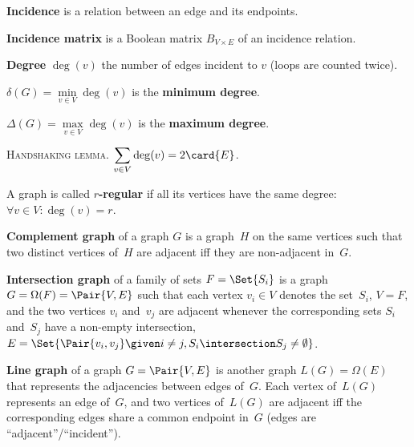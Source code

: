 \documentclass[a4paper,10pt]{article}
\newcommand{\op}[1]{\operatorname*{#1}}
\newcommand{\degree}[1]{\op{deg}(#1)}
\newcommand{\minDegree}[1]{\delta(#1)}
\newcommand{\maxDegree}[1]{\Delta(#1)}
\begin{document}
\begin{terms}
\begin{minipage}{\linewidth}
    \item \textbf{Incidence} is a relation between an edge and its endpoints.
    \item \textbf{Incidence matrix} is a Boolean matrix $B_{V \times E}$ of an incidence relation.

    \end{minipage}

    \item \textbf{Degree} $\degree{v}$ the number of edges incident to $v$ (loops are counted twice).

    \begin{terms}
        \item $\minDegree{G} = \min\limits_{v \in V} \degree{v}$ is the \textbf{minimum degree}.
        \item $\maxDegree{G} = \max\limits_{v \in V} \degree{v}$ is the \textbf{maximum degree}.
        \item \textsc{Handshaking lemma}. $\displaystyle \sum_{v \in V} \degree{v} = 2 \card{E}$.
    \end{terms}

    \item A graph is called \textbf{$r$-regular} if all its vertices have the same degree: $\forall v \in V : \degree{v} = r$.

    \item \textbf{Complement graph} of a graph $G$ is a graph~$H$ on the same vertices such that two distinct vertices of~$H$ are adjacent iff they are non-adjacent in~$G$.

    \item \textbf{Intersection graph} of a family of sets $F = \Set{S_i}$ is a graph $G = \Omega(F) = \Pair{V,E}$ such that each vertex $v_i \in V$ denotes the set~$S_i$, \ie $V = F$, and the two vertices $v_i$ and~$v_j$ are adjacent whenever the corresponding sets $S_i$ and~$S_j$ have a non-empty intersection, \ie $E = \Set{ \Pair{v_i,v_j} \given i \neq j, S_i \intersection S_j \neq \emptyset }$.

    \item \textbf{Line graph} of a graph $G = \Pair{V,E}$ is another graph $L(G) = \Omega(E)$ that represents the adjacencies between edges of~$G$. Each vertex of~$L(G)$ represents an edge of~$G$, and two vertices of~$L(G)$ are adjacent iff the corresponding edges share a common endpoint in~$G$ (\ie edges are \enquote{adjacent}/\enquote{incident}).


\end{terms}
\end{document}
